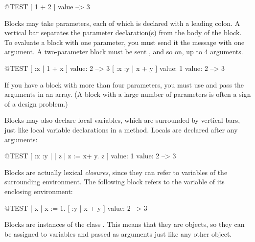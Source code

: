 \documentclass[a4paper,10pt,twoside]{book}
\begin{document}
\begin{code}{@TEST}
[ 1 + 2 ] value --> 3
\end{code}

Blocks may take parameters, each of which is declared with a leading colon.
A  vertical bar separates the parameter declaration(s) from the body of the block.
To evaluate a block with one parameter, you must send it the message  with one argument.
A two-parameter block must be sent , and so on, up to 4 arguments.

\begin{code}{@TEST}
[ :x | 1 + x ] value: 2 --> 3
[ :x :y | x + y ] value: 1 value: 2 --> 3
\end{code}

If you have a block with more than four parameters, you must use  and pass the arguments in an array.
(A block with a large number of parameters is often a sign of a design problem.)

Blocks may also declare local variables, which are surrounded by vertical bars, just like local variable declarations in a method.
Locals are declared after any arguments:

\begin{code}{@TEST}
[ :x :y | | z | z := x+ y. z ] value: 1 value: 2 --> 3
\end{code}

Blocks are actually lexical \emph{closures}, since they can refer to variables of the surrounding environment.
The following block refers to the variable  of its enclosing environment:

\begin{code}{@TEST}
| x |
x := 1.
[ :y | x + y ] value: 2 --> 3
\end{code}

Blocks are instances of the class .
This means that they are objects, so they can be assigned to variables and passed as arguments just like any other object.
\end{document}
